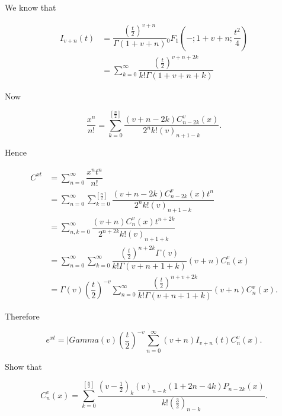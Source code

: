 \begin{solution}
We know that

$$\begin{array}{ll}
I_{v+n}(t) &= \dfrac{(\frac{t}{2})^{v+n}}{\Gamma(1+v+n)} {}_0F_1 \left(-;1+v+n; \dfrac{t^2}{4} \right) \\
&= \displaystyle\sum_{k=0}^{\infty} \dfrac{(\frac{t}{2})^{v+n+2k}}{k! \Gamma(1+v+n+k)}
\end{array}$$

Now

$$\dfrac{x^n}{n!} = \displaystyle\sum_{k=0}^{[\frac{n}{2}]} \dfrac{(v+n-2k) C_{n-2k}^v(x)}{2^n k! (v)_{n+1-k}}.$$

Hence

$$\begin{array}{ll}
C^{xt} &= \displaystyle\sum_{n=0}^{\infty} \dfrac{x^n t^n}{n!} \\
&= \displaystyle\sum_{n=0}^{\infty} \displaystyle\sum_{k=0}^{[\frac{n}{2}]} \dfrac{(v+n-2k) C_{n-2k}^v(x) t^n}{2^n k! (v)_{n+1-k}} \\
&= \displaystyle\sum_{n,k=0}^{\infty} \dfrac{(v+n) C_n^v(x) t^{n+2k}}{2^{n+2k} k! (v)_{n+1+k}} \\
&= \displaystyle\sum_{n=0}^{\infty} \displaystyle\sum_{k=0}^{\infty} \dfrac{(\frac{t}{2})^{n+2k} \Gamma(v)}{k! \Gamma(v+n+1+k)} (v+n)C_n^v(x) \\
&= \Gamma(v) \left( \dfrac{t}{2} \right)^{-v} \displaystyle\sum_{n=0}^{\infty} \dfrac{(\frac{t}{2})^{n+v+2k}}{k! \Gamma(v+n+1+k)} (v+n)C_n^v(x).
\end{array}$$

Therefore

$$e^{xt} = |Gamma(v) \left( \dfrac{t}{2} \right)^{-v} \displaystyle\sum_{n=0}^{\infty} (v+n) I_{v+n}(t) C_n^v(x).$$
\end{solution}
\begin{problem}\label{problem4chapter17}
Show that

$$C_n^v(x) = \displaystyle\sum_{k=0}^{[\frac{n}{2}]} \dfrac{(v-\frac{1}{2})_k(v)_{n-k}(1+2n-4k)P_{n-2k}(x)}{k! (\frac{3}{2})_{n-k}}.$$
\end{problem}
